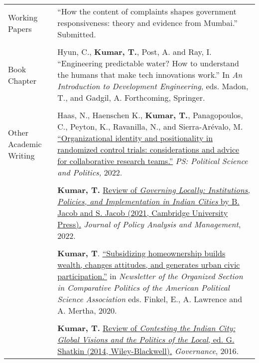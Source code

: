 \documentclass[letterpaper, 10pt]{article}
\begin{document}
\begin{longtable}{p{1in}p{5.5in}}
{{Working Papers}} 


& ``How the content of complaints shapes government responsiveness: theory and evidence from Mumbai.'' Submitted. \\
& \\


{{Book Chapter}} 
& Hyun, C., \textbf{Kumar, T.}, Post, A. and Ray, I. ``Engineering predictable water? How to understand the humans that make tech innovations work.'' In \textit{An Introduction to Development Engineering}, eds. Madon, T., and Gadgil, A. Forthcoming, Springer.\\

& \\

{{Other Academic Writing}} 
& Haas, N., Haenschen K., \textbf{Kumar, T.}, Panagopoulos, C., Peyton, K., Ravanilla, N., and Sierra-Ar\'{e}valo, M. \href{https://www.doi.org/10.1017/S1049096522000026}{``Organizational identity and positionality in randomized control trials: considerations and advice for collaborative research teams.''} \textit{PS: Political Science and Politics,} 2022. \\
& \\


& \textbf{Kumar, T.} \href{https://doi.org/10.1002/pam.22390}{Review of \textit{Governing Locally: Institutions, Policies, and Implementation in Indian Cities} by B. Jacob and S. Jacob (2021, Cambridge University Press).}  \textit{Journal of Policy Analysis and Management}, 2022. \\


& \\


& \textbf{Kumar, T}.
 \href{https://www.comparativepoliticsnewsletter.org/wp-content/uploads/2020/05/Spring-Newsletter-2020.pdf}{``Subsidizing homeownership builds wealth, changes attitudes, and generates urban civic participation.''} in \textit{Newsletter of the Organized Section in Comparative Politics of the American Political Science Association} eds. Finkel, E., A. Lawrence and A. Mertha, 2020. \\
&\\
& \textbf{Kumar, T.} \href{http://onlinelibrary.wiley.com/doi/10.1111/gove.12241/abstract}{Review of \textit{Contesting the Indian City: Global Visions and the Politics of the Local}, ed. G. Shatkin (2014, Wiley-Blackwell).} \textit{Governance}, 2016. 


\end{longtable}
\end{document}
